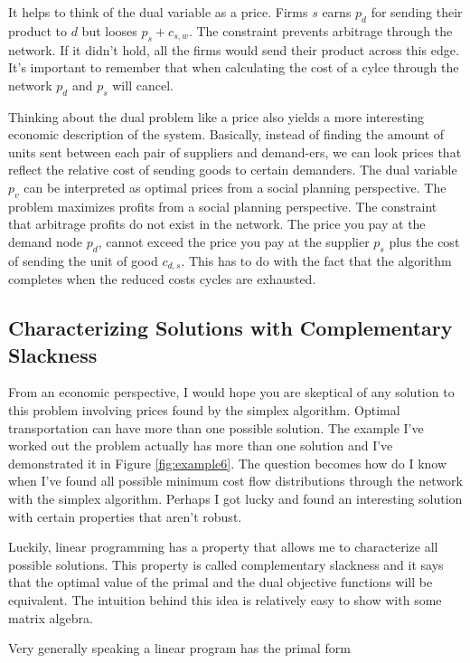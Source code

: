 \documentclass{report}
\begin{document}
It helps to think of the dual variable as a price. Firms $s$ earns $p_d$ for sending their product to $d$ but looses $p_s + c_{s,w}$. The constraint prevents arbitrage through the network. If it didn't hold, all the firms would send their product across this edge. It's important to remember that when calculating the cost of a cylce through the network $p_d$ and $p_s$ will cancel. 

Thinking about the dual problem like a price also yields a more interesting economic description of the system. Basically, instead of finding the amount of units sent between each pair of suppliers and demand-ers, we can look prices that reflect the relative cost of sending goods to certain demanders. The dual variable $p_v$ can be interpreted as optimal prices from a social planning perspective. The problem maximizes profits from a social planning perspective. The constraint that arbitrage profits do not exist in the network. The price you pay at the demand node $p_d$, cannot exceed the price you pay at the supplier $p_s$ plus the cost of sending the unit of good $c_{d,s}$. This has to do with the fact that the algorithm completes when the reduced costs cycles are exhausted.

\subsection{Characterizing Solutions with Complementary Slackness}

From an economic perspective, I would hope you are skeptical of any solution to this problem involving prices found by the simplex algorithm. Optimal transportation can have more than one possible solution. The example I've worked out the problem actually has more than one solution and I've demonstrated it in Figure \ref{fig:example6}. The question becomes how do I know when I've found all possible minimum cost flow distributions through the network with the simplex algorithm. Perhaps I got lucky and found an interesting solution with certain properties that aren't robust.

Luckily, linear programming has a property that allows me to characterize all possible solutions. This property is called complementary slackness and it says that the optimal value of the primal and the dual objective functions will be equivalent. The intuition behind this idea is relatively easy to show with some matrix algebra.

Very generally speaking a linear program has the primal form
\end{document}
